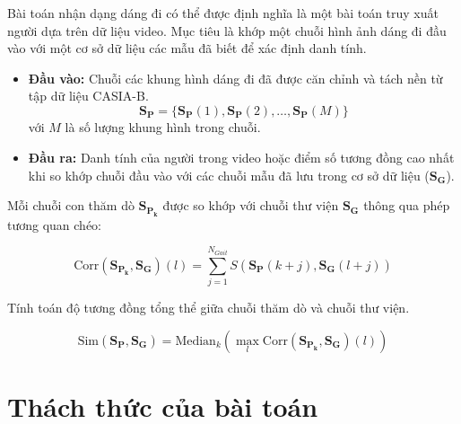 Bài toán nhận dạng dáng đi có thể được định nghĩa là một bài toán truy xuất người dựa trên dữ liệu video. Mục tiêu là khớp một chuỗi hình ảnh dáng đi đầu vào với một cơ sở dữ liệu các mẫu đã biết để xác định danh tính.
\begin{itemize}
    \item \textbf{Đầu vào:} Chuỗi các khung hình dáng đi đã được căn chỉnh và tách nền từ tập dữ liệu CASIA-B.
          $$\mathbf{S_P} = \{ \mathbf{S_P}(1), \mathbf{S_P}(2), \dots, \mathbf{S_P}(M) \}$$ với $M$ là số lượng khung hình trong chuỗi.
    \item \textbf{Đầu ra:} Danh tính của người trong video hoặc điểm số tương đồng cao nhất khi so khớp chuỗi đầu vào với các chuỗi mẫu đã lưu trong cơ sở dữ liệu ($\mathbf{S_G}$).
\end{itemize}

Mỗi chuỗi con thăm dò $\mathbf{S_{P_k}}$ được so khớp với chuỗi thư viện $\mathbf{S_G}$ thông qua phép tương quan chéo:

\begin{equation} \label{eqn:general}
    \text{Corr}(\mathbf{S_{P_k}}, \mathbf{S_G})(l) = \sum_{j=1}^{N_{Gait}} S(\mathbf{S_P}(k+j), \mathbf{S_G}(l+j))
\end{equation}

Tính toán độ tương đồng tổng thể giữa chuỗi thăm dò và chuỗi thư viện.

\begin{equation} \label{eqn:generalcon}
    \text{Sim}(\mathbf{S_P}, \mathbf{S_G}) = \text{Median}_k \left( \max_l \text{Corr}(\mathbf{S_{P_k}}, \mathbf{S_G})(l) \right)
\end{equation}


\section{Thách thức của bài toán}

